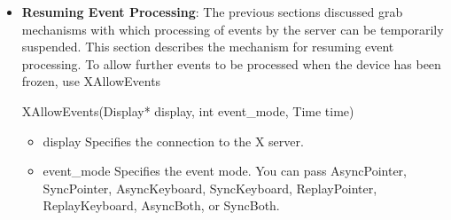 \documentclass{report}
\begin{document}
\begin{itemize}
            To ungrab a key, use XUngrabKey.
            \bigbreak \noindent 
            \begin{cppcode}
                XUngrabKey (Display display, int keycode, unsigned int modifiers, Window grab_window)
            \end{cppcode}
            \bigbreak \noindent
            \begin{itemize}
                \item display Specifies the connection to the X server.
                \item keycode Specifies the KeyCode or AnyKey.
                \item modifiers Specifies the set of keymasks or AnyModifier. The mask is the bitwise inclusive
                \item OR of the valid keymask bits.
                \item grab\_window Specifies the grab window.
            \end{itemize}
            The XUngrabKey function releases the key combination on the specified window if it was grabbed by this client. It has no effect on an active grab. A modifiers of AnyModifier is equivalent to issuing the request for all possible modifier combinations (including the combination of no modifiers). A keycode argument of AnyKey is equivalent to issuing the request for all possible key codes.
            \bigbreak \noindent 
            XUngrabKey can generate BadValue and BadWindow errors.
        \item \textbf{Resuming Event Processing}: The previous sections discussed grab mechanisms with which processing of events by the server can be temporarily suspended. This section describes the mechanism for resuming event processing.
            \bigbreak \noindent 
            To allow further events to be processed when the device has been frozen, use XAllowEvents
            \bigbreak \noindent 
            \begin{cppcode}
            XAllowEvents(Display* display, int event_mode, Time time)
            \end{cppcode}
            \bigbreak \noindent
            \begin{itemize}
                \item display Specifies the connection to the X server.
                \item event\_mode Specifies the event mode. You can pass AsyncPointer, SyncPointer, AsyncKeyboard, SyncKeyboard, ReplayPointer, ReplayKeyboard, AsyncBoth, or SyncBoth.

\end{itemize}
\end{itemize}
\end{document}
